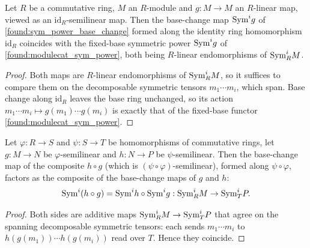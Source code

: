 \begin{lemma}\leanok
  \label{found:sym_base_change_map_id}
  Let \(R\) be a commutative ring, \(M\) an \(R\)-module and \(g:M\to M\) an
  \(R\)-linear map, viewed as an \(\mathrm{id}_R\)-semilinear map.  Then the
  base-change map \(\mathrm{Sym}^i g\) of \cref{found:sym_power_base_change} formed along
  the identity ring homomorphism \(\mathrm{id}_R\) coincides with the fixed-base
  symmetric power \(\mathrm{Sym}^i g\) of \cref{found:modulecat_sym_power}, both being
  \(R\)-linear endomorphisms of \(\mathrm{Sym}^i_R M\).
\end{lemma}

\begin{proof}\leanok
  Both maps are \(R\)-linear endomorphisms of \(\mathrm{Sym}^i_R M\), so it suffices to
  compare them on the decomposable symmetric tensors \(m_1\cdots m_i\), which span.
  Base change along \(\mathrm{id}_R\) leaves the base ring unchanged, so its action
  \(m_1\cdots m_i\mapsto g(m_1)\cdots g(m_i)\) is exactly that of the fixed-base
  functor \cref{found:modulecat_sym_power}.
\end{proof}

\begin{lemma}\leanok
  \label{found:sym_base_change_map_comp}
  Let \(\varphi:R\to S\) and \(\psi:S\to T\) be homomorphisms of commutative rings,
  let \(g:M\to N\) be \(\varphi\)-semilinear and \(h:N\to P\) be
  \(\psi\)-semilinear.  Then the base-change map of the composite \(h\circ g\)
  (which is \((\psi\circ\varphi)\)-semilinear), formed along \(\psi\circ\varphi\),
  factors as the composite of the base-change maps of \(g\) and \(h\):
  \[
    \mathrm{Sym}^i(h\circ g)=\mathrm{Sym}^i h\circ\mathrm{Sym}^i g
    :\mathrm{Sym}^i_R M\to\mathrm{Sym}^i_T P .
  \]
\end{lemma}

\begin{proof}\leanok
  Both sides are additive maps \(\mathrm{Sym}^i_R M\to\mathrm{Sym}^i_T P\) that agree on the
  spanning decomposable symmetric tensors: each sends \(m_1\cdots m_i\) to
  \(h(g(m_1))\cdots h(g(m_i))\) read over \(T\).  Hence they coincide.
\end{proof}


